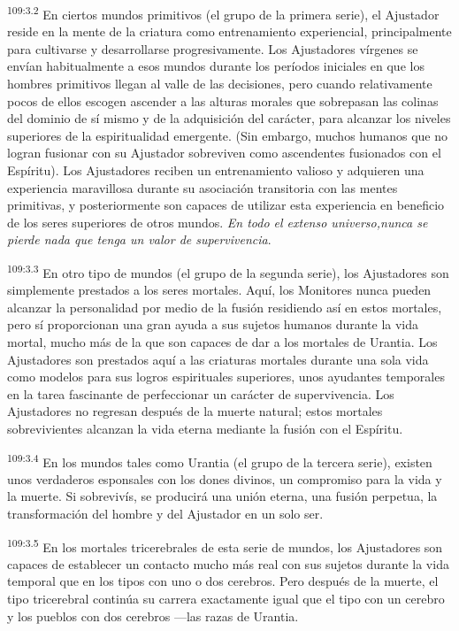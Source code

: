 \par
\textsuperscript{109:3.2} En ciertos mundos primitivos (el grupo de la primera serie), el Ajustador reside en la mente de la criatura como entrenamiento experiencial, principalmente para cultivarse y desarrollarse progresivamente. Los Ajustadores vírgenes se envían habitualmente a esos mundos durante los períodos iniciales en que los hombres primitivos llegan al valle de las decisiones, pero cuando relativamente pocos de ellos escogen ascender a las alturas morales que sobrepasan las colinas del dominio de sí mismo y de la adquisición del carácter, para alcanzar los niveles superiores de la espiritualidad emergente. (Sin embargo, muchos humanos que no logran fusionar con su Ajustador sobreviven como ascendentes fusionados con el Espíritu). Los Ajustadores reciben un entrenamiento valioso y adquieren una experiencia maravillosa durante su asociación transitoria con las mentes primitivas, y posteriormente son capaces de utilizar esta experiencia en beneficio de los seres superiores de otros mundos. \textit{En todo el extenso universo,nunca se pierde nada que tenga un valor de supervivencia}.

\par
\textsuperscript{109:3.3} En otro tipo de mundos (el grupo de la segunda serie), los Ajustadores son simplemente prestados a los seres mortales. Aquí, los Monitores nunca pueden alcanzar la personalidad por medio de la fusión residiendo así en estos mortales, pero sí proporcionan una gran ayuda a sus sujetos humanos durante la vida mortal, mucho más de la que son capaces de dar a los mortales de Urantia. Los Ajustadores son prestados aquí a las criaturas mortales durante una sola vida como modelos para sus logros espirituales superiores, unos ayudantes temporales en la tarea fascinante de perfeccionar un carácter de supervivencia. Los Ajustadores no regresan después de la muerte natural; estos mortales sobrevivientes alcanzan la vida eterna mediante la fusión con el Espíritu.

\par
\textsuperscript{109:3.4} En los mundos tales como Urantia (el grupo de la tercera serie), existen unos verdaderos esponsales con los dones divinos, un compromiso para la vida y la muerte. Si sobrevivís, se producirá una unión eterna, una fusión perpetua, la transformación del hombre y del Ajustador en un solo ser.

\par
\textsuperscript{109:3.5} En los mortales tricerebrales de esta serie de mundos, los Ajustadores son capaces de establecer un contacto mucho más real con sus sujetos durante la vida temporal que en los tipos con uno o dos cerebros. Pero después de la muerte, el tipo tricerebral continúa su carrera exactamente igual que el tipo con un cerebro y los pueblos con dos cerebros ---las razas de Urantia.

